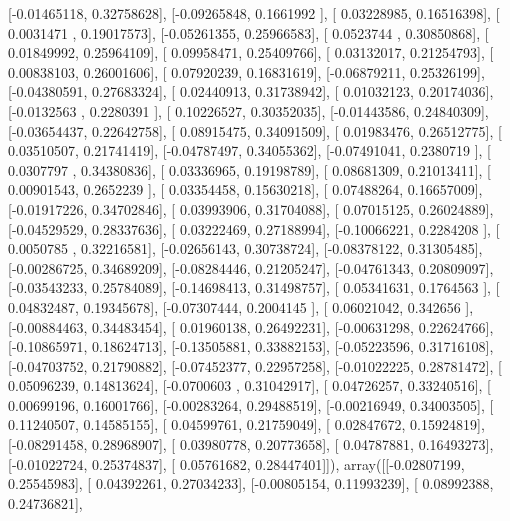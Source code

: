\documentclass{article}
\begin{document}
       [-0.01465118,  0.32758628],
       [-0.09265848,  0.1661992 ],
       [ 0.03228985,  0.16516398],
       [ 0.0031471 ,  0.19017573],
       [-0.05261355,  0.25966583],
       [ 0.0523744 ,  0.30850868],
       [ 0.01849992,  0.25964109],
       [ 0.09958471,  0.25409766],
       [ 0.03132017,  0.21254793],
       [ 0.00838103,  0.26001606],
       [ 0.07920239,  0.16831619],
       [-0.06879211,  0.25326199],
       [-0.04380591,  0.27683324],
       [ 0.02440913,  0.31738942],
       [ 0.01032123,  0.20174036],
       [-0.0132563 ,  0.2280391 ],
       [ 0.10226527,  0.30352035],
       [-0.01443586,  0.24840309],
       [-0.03654437,  0.22642758],
       [ 0.08915475,  0.34091509],
       [ 0.01983476,  0.26512775],
       [ 0.03510507,  0.21741419],
       [-0.04787497,  0.34055362],
       [-0.07491041,  0.2380719 ],
       [ 0.0307797 ,  0.34380836],
       [ 0.03336965,  0.19198789],
       [ 0.08681309,  0.21013411],
       [ 0.00901543,  0.2652239 ],
       [ 0.03354458,  0.15630218],
       [ 0.07488264,  0.16657009],
       [-0.01917226,  0.34702846],
       [ 0.03993906,  0.31704088],
       [ 0.07015125,  0.26024889],
       [-0.04529529,  0.28337636],
       [ 0.03222469,  0.27188994],
       [-0.10066221,  0.2284208 ],
       [ 0.0050785 ,  0.32216581],
       [-0.02656143,  0.30738724],
       [-0.08378122,  0.31305485],
       [-0.00286725,  0.34689209],
       [-0.08284446,  0.21205247],
       [-0.04761343,  0.20809097],
       [-0.03543233,  0.25784089],
       [-0.14698413,  0.31498757],
       [ 0.05341631,  0.1764563 ],
       [ 0.04832487,  0.19345678],
       [-0.07307444,  0.2004145 ],
       [ 0.06021042,  0.342656  ],
       [-0.00884463,  0.34483454],
       [ 0.01960138,  0.26492231],
       [-0.00631298,  0.22624766],
       [-0.10865971,  0.18624713],
       [-0.13505881,  0.33882153],
       [-0.05223596,  0.31716108],
       [-0.04703752,  0.21790882],
       [-0.07452377,  0.22957258],
       [-0.01022225,  0.28781472],
       [ 0.05096239,  0.14813624],
       [-0.0700603 ,  0.31042917],
       [ 0.04726257,  0.33240516],
       [ 0.00699196,  0.16001766],
       [-0.00283264,  0.29488519],
       [-0.00216949,  0.34003505],
       [ 0.11240507,  0.14585155],
       [ 0.04599761,  0.21759049],
       [ 0.02847672,  0.15924819],
       [-0.08291458,  0.28968907],
       [ 0.03980778,  0.20773658],
       [ 0.04787881,  0.16493273],
       [-0.01022724,  0.25374837],
       [ 0.05761682,  0.28447401]]), array([[-0.02807199,  0.25545983],
       [ 0.04392261,  0.27034233],
       [-0.00805154,  0.11993239],
       [ 0.08992388,  0.24736821],
\end{document}
